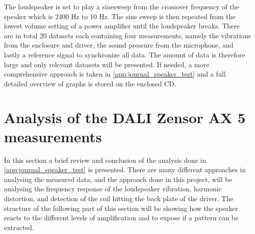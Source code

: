 The loudspeaker is set to play a sinesweep from the crossover frequency of the speaker which is 2400 Hz to 10 Hz. The sine sweep is then repeated from the lowest volume setting of a power amplifier until the loudspeaker breaks. There are in total 20 datasets each containing four measurements, namely the vibrations from the enclosure and driver, the sound pressure from the microphone, and lastly a reference signal to synchronize all data. The amount of data is therefore large and only relevant datasets will be presented. If needed, a more comprehensive approach is taken in \autoref{app:journal_speaker_test} and a full detailed overview of graphs is stored on the enclosed CD.%


\section{Analysis of the DALI Zensor AX 5 measurements}

In this section a brief review and conclusion of the analysis done in \autoref{app:journal_speaker_test} is presented. %
There are many different approaches in analysing the measured data, and the approach done in this project, will be analysing the frequency response of the loudspeaker vibration, harmonic distortion, and detection of the coil hitting the back plate of the driver. The structure of the following part of this section will be showing how the speaker reacts to the different levels of amplification and to expose if a pattern can be extracted.



